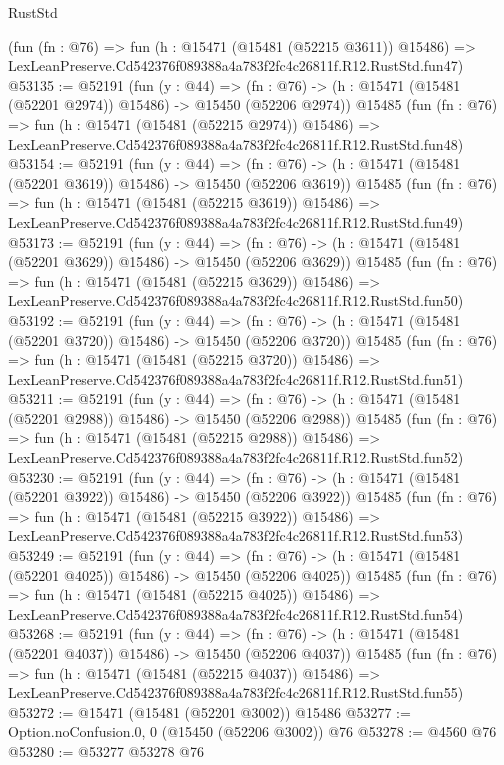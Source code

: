 \begin{lexlean}{RustStd}
\begin{coremodule}
    (fun (fn : @76) =>
    fun (h : @15471 (@15481 (@52215 @3611)) @15486) =>
    LexLeanPreserve.Cd542376f089388a4a783f2fc4c26811f.R12.RustStd.fun47)
@53135 := @52191
    (fun (y : @44) =>
    (fn : @76) -> (h : @15471 (@15481 (@52201 @2974)) @15486) -> @15450 (@52206 @2974))
    @15485
    (fun (fn : @76) =>
    fun (h : @15471 (@15481 (@52215 @2974)) @15486) =>
    LexLeanPreserve.Cd542376f089388a4a783f2fc4c26811f.R12.RustStd.fun48)
@53154 := @52191
    (fun (y : @44) =>
    (fn : @76) -> (h : @15471 (@15481 (@52201 @3619)) @15486) -> @15450 (@52206 @3619))
    @15485
    (fun (fn : @76) =>
    fun (h : @15471 (@15481 (@52215 @3619)) @15486) =>
    LexLeanPreserve.Cd542376f089388a4a783f2fc4c26811f.R12.RustStd.fun49)
@53173 := @52191
    (fun (y : @44) =>
    (fn : @76) -> (h : @15471 (@15481 (@52201 @3629)) @15486) -> @15450 (@52206 @3629))
    @15485
    (fun (fn : @76) =>
    fun (h : @15471 (@15481 (@52215 @3629)) @15486) =>
    LexLeanPreserve.Cd542376f089388a4a783f2fc4c26811f.R12.RustStd.fun50)
@53192 := @52191
    (fun (y : @44) =>
    (fn : @76) -> (h : @15471 (@15481 (@52201 @3720)) @15486) -> @15450 (@52206 @3720))
    @15485
    (fun (fn : @76) =>
    fun (h : @15471 (@15481 (@52215 @3720)) @15486) =>
    LexLeanPreserve.Cd542376f089388a4a783f2fc4c26811f.R12.RustStd.fun51)
@53211 := @52191
    (fun (y : @44) =>
    (fn : @76) -> (h : @15471 (@15481 (@52201 @2988)) @15486) -> @15450 (@52206 @2988))
    @15485
    (fun (fn : @76) =>
    fun (h : @15471 (@15481 (@52215 @2988)) @15486) =>
    LexLeanPreserve.Cd542376f089388a4a783f2fc4c26811f.R12.RustStd.fun52)
@53230 := @52191
    (fun (y : @44) =>
    (fn : @76) -> (h : @15471 (@15481 (@52201 @3922)) @15486) -> @15450 (@52206 @3922))
    @15485
    (fun (fn : @76) =>
    fun (h : @15471 (@15481 (@52215 @3922)) @15486) =>
    LexLeanPreserve.Cd542376f089388a4a783f2fc4c26811f.R12.RustStd.fun53)
@53249 := @52191
    (fun (y : @44) =>
    (fn : @76) -> (h : @15471 (@15481 (@52201 @4025)) @15486) -> @15450 (@52206 @4025))
    @15485
    (fun (fn : @76) =>
    fun (h : @15471 (@15481 (@52215 @4025)) @15486) =>
    LexLeanPreserve.Cd542376f089388a4a783f2fc4c26811f.R12.RustStd.fun54)
@53268 := @52191
    (fun (y : @44) =>
    (fn : @76) -> (h : @15471 (@15481 (@52201 @4037)) @15486) -> @15450 (@52206 @4037))
    @15485
    (fun (fn : @76) =>
    fun (h : @15471 (@15481 (@52215 @4037)) @15486) =>
    LexLeanPreserve.Cd542376f089388a4a783f2fc4c26811f.R12.RustStd.fun55)
@53272 := @15471 (@15481 (@52201 @3002)) @15486
@53277 := Option.noConfusion.{0, 0} (@15450 (@52206 @3002)) @76
@53278 := @4560 @76
@53280 := @53277 @53278 @76

\end{coremodule}
\end{lexlean}
